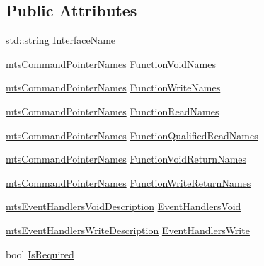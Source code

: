 \subsection*{Public Attributes}
\begin{DoxyCompactItemize}
\item 
std\-::string \hyperlink{classmts_interface_required_description_a8ef893e8fc8881d31e85060b9d72fb84}{Interface\-Name}
\item 
\hyperlink{mts_interface_common_8h_a19f2c08080081cfd55cf64a7a5fc66cd}{mts\-Command\-Pointer\-Names} \hyperlink{classmts_interface_required_description_acb503c6d1cc90d02415fad8a5f9b6256}{Function\-Void\-Names}
\item 
\hyperlink{mts_interface_common_8h_a19f2c08080081cfd55cf64a7a5fc66cd}{mts\-Command\-Pointer\-Names} \hyperlink{classmts_interface_required_description_ab1a5d3c1ec18381021218a70864088cb}{Function\-Write\-Names}
\item 
\hyperlink{mts_interface_common_8h_a19f2c08080081cfd55cf64a7a5fc66cd}{mts\-Command\-Pointer\-Names} \hyperlink{classmts_interface_required_description_aa6e97799254bced249ae10abeca0553a}{Function\-Read\-Names}
\item 
\hyperlink{mts_interface_common_8h_a19f2c08080081cfd55cf64a7a5fc66cd}{mts\-Command\-Pointer\-Names} \hyperlink{classmts_interface_required_description_ac5da751a184876eebbd9eb3c30319137}{Function\-Qualified\-Read\-Names}
\item 
\hyperlink{mts_interface_common_8h_a19f2c08080081cfd55cf64a7a5fc66cd}{mts\-Command\-Pointer\-Names} \hyperlink{classmts_interface_required_description_add8ee8d91fbc554de70b8ec932ce0d51}{Function\-Void\-Return\-Names}
\item 
\hyperlink{mts_interface_common_8h_a19f2c08080081cfd55cf64a7a5fc66cd}{mts\-Command\-Pointer\-Names} \hyperlink{classmts_interface_required_description_a3b8f038c5695fa5811879606e9f8de9e}{Function\-Write\-Return\-Names}
\item 
\hyperlink{mts_interface_common_8h_a5f4e10ae813c8f00dc5f2a5af3be07aa}{mts\-Event\-Handlers\-Void\-Description} \hyperlink{classmts_interface_required_description_a47eb0712a0144d7accf7cd4e52a07468}{Event\-Handlers\-Void}
\item 
\hyperlink{mts_interface_common_8h_ad16a3044918ddd1cf5a6f63dc197f353}{mts\-Event\-Handlers\-Write\-Description} \hyperlink{classmts_interface_required_description_af605400a48cb18b6cddf841165f4d6ba}{Event\-Handlers\-Write}
\item 
bool \hyperlink{classmts_interface_required_description_ae56c8fe1cb63d5e712edb530c6d91f2c}{Is\-Required}
\end{DoxyCompactItemize}


